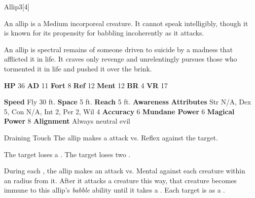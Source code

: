       
  \begin{monsection}{Allip}{3}[4]
    \vspace{-1em}\vspace{-1em}
    \vspace{0em}

    
        An allip is a Medium incorporeal creature.
        It cannot speak intelligibly, though it is known for its propensity for babbling incoherently as it attacks.
      
        An allip is spectral remains of someone driven to suicide by a madness that afflicted it in life.
        It craves only revenge and unrelentingly pursues those who tormented it in life and pushed it over the brink.
      

    \begin{spellcontent}
      \begin{spelltargetinginfo}
        \pari \textbf{HP} 36 \monsep
          \textbf{AD} 11 \monsep
          \textbf{Fort} 8 \monsep
          \textbf{Ref} 12 \monsep
          \textbf{Ment} 12
        \pari \textbf{BR} 4 \monsep
        \textbf{VR} 17
        
      \end{spelltargetinginfo}
    \end{spellcontent}
    \begin{monsterfooter}
      \pari \textbf{Speed} Fly 30 ft. \monsep
        \textbf{Space} 5 ft. \monsep
        \textbf{Reach} 5 ft.
      \pari \textbf{Awareness} 
      \pari \textbf{Attributes}
        Str N/A, Dex 5,
        Con N/A, Int 2,
        Per 2, Wil 4
      \pari \textbf{Accuracy} 6 \monsep
        \textbf{Mundane Power} 6 \monsep
      \textbf{Magical Power} 8
      \pari \textbf{Alignment} Always neutral evil
    \end{monsterfooter}
  \end{monsection}
  \begin{freeability}{Draining Touch}
       The allip makes a  attack
        vs. Reflex against the target.
    
    \hit The target loses a .
    \crit The target loses two .
    \end{freeability}
  
      
          During each , the allip makes an attack vs. Mental against each creature
          within an \arealarge radius  from it.
          After it attacks a creature this way, that creature becomes immune to this allip's \textit{babble} ability until it takes a .
          \hit Each target is  as a .
        
